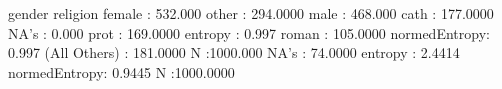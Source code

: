 \begin{Schunk}
\begin{Soutput}
           gender                  religion        
 female       : 532.000   other        : 294.0000  
 male         : 468.000   cath         : 177.0000  
 NA's         :   0.000   prot         : 169.0000  
 entropy      :   0.997   roman        : 105.0000  
 normedEntropy:   0.997   (All Others) : 181.0000  
 N            :1000.000   NA's         :  74.0000  
                          entropy      :   2.4414  
                          normedEntropy:   0.9445  
                          N            :1000.0000  
\end{Soutput}
\end{Schunk}
